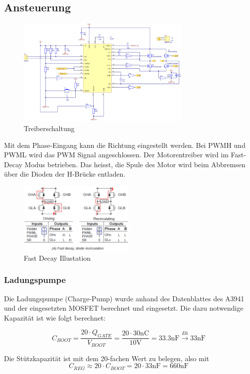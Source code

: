 \subsection{Ansteuerung}

\begin{figure}[h!]
	\centering
	\includegraphics[width=0.75\textwidth]{src/dc/fig/driver_schematic.png}
	\caption{Treiberschaltung}
\end{figure}

Mit dem Phase-Eingang kann die Richtung eingestellt werden. Bei PWMH und
PWML wird das PWM Signal angeschlossen. Der Motorentreiber wird im
Fast-Decay Modus betrieben. Das heisst, die Spule des Motor wird beim
Abbremsen über die Dioden der H-Brücke entladen.

\begin{figure}[h!]
	\centering
	\includegraphics[width=0.5\textwidth]{src/dc/fig/decay.png}
	\caption{Fast Decay Illustation}
\end{figure}

\subsubsection{Ladungspumpe}
Die Ladungspumpe (Charge-Pump) wurde anhand des Datenblattes des A3941
und der eingesetzten MOSFET berechnet und eingesetzt. Die dazu notwendige
Kapazität ist wie folgt berechnet:

\[  
	C_{BOOT}
		= \frac{20 \cdot Q_{GATE}}{V_{BOOT}}
		= \frac{20 \cdot 30\mathrm{nC}}{10\mathrm{V}}
		= 33.3\mathrm{nF} 
		\xrightarrow{E6} 33\mathrm{nF}
\]

\noindent
Die Stützkapazität ist mit dem 20-fachen Wert zu belegen, also mit
\[
	C_{REG}
		\approx 20 \cdot C_{BOOT}
		= 20 \cdot 33\mathrm{nF}
		= 660\mathrm{nF}
\]
